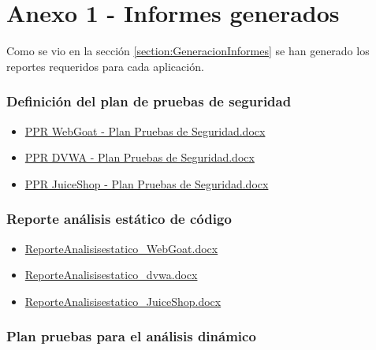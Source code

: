 \chapter{Anexo 1 - Informes generados}
Como se vio en la sección \ref{section:GeneracionInformes} se han generado los reportes requeridos para cada aplicación.

\subsection{Definición del plan de pruebas de seguridad}
\begin{itemize}
    \item \href{https://github.com/M0l1n3ta/PFG/blob/master/Reportes/01%20-%20PPR%20-%20Plan%20de%20pruebas/PPR%20WebGoat%20-%20Plan%20Pruebas%20de%20Seguridad.docx}{PPR WebGoat - Plan Pruebas de Seguridad.docx}
    \item \href{https://github.com/M0l1n3ta/PFG/blob/master/Reportes/01%20-%20PPR%20-%20Plan%20de%20pruebas/PPR%20DVWA%20-%20Plan%20Pruebas%20de%20Seguridad.docx}{PPR DVWA - Plan Pruebas de Seguridad.docx}
    \item \href{https://github.com/M0l1n3ta/PFG/blob/master/Reportes/01%20-%20PPR%20-%20Plan%20de%20pruebas/PPR%20JuiceShop%20-%20Plan%20Pruebas%20de%20Seguridad.docx}{PPR JuiceShop - Plan Pruebas de Seguridad.docx}
\end{itemize}

\subsection{Reporte análisis estático de código}

\begin{itemize}
    \item \href{https://github.com/M0l1n3ta/PFG/blob/master/Reportes/02%20-%20An%C3%A1lisis%20estatico%20de%20c%C3%B3digo/ReporteAnalisisestatico_WebGoat.docx}{ReporteAnalisisestatico_WebGoat.docx}
    \item \href{https://github.com/M0l1n3ta/PFG/blob/master/Reportes/02%20-%20An%C3%A1lisis%20estatico%20de%20c%C3%B3digo/ReporteAnalisisestatico_dvwa.docx}{ReporteAnalisisestatico_dvwa.docx}
    \item \href{https://github.com/M0l1n3ta/PFG/blob/master/Reportes/02%20-%20An%C3%A1lisis%20estatico%20de%20c%C3%B3digo/ReporteAnalisisestatico_JuiceShop.docx}{ReporteAnalisisestatico_JuiceShop.docx}
\end{itemize}

\subsection{Plan pruebas para el análisis dinámico}

